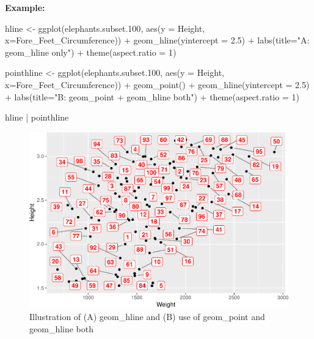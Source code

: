 \documentclass[
]{book}
\newenvironment{Shaded}{\begin{snugshade}}{\end{snugshade}}
\newcommand{\AttributeTok}[1]{\textcolor[rgb]{0.77,0.63,0.00}{#1}}
\newcommand{\DecValTok}[1]{\textcolor[rgb]{0.00,0.00,0.81}{#1}}
\newcommand{\FloatTok}[1]{\textcolor[rgb]{0.00,0.00,0.81}{#1}}
\newcommand{\FunctionTok}[1]{\textcolor[rgb]{0.00,0.00,0.00}{#1}}
\newcommand{\NormalTok}[1]{#1}
\newcommand{\OtherTok}[1]{\textcolor[rgb]{0.56,0.35,0.01}{#1}}
\newcommand{\SpecialCharTok}[1]{\textcolor[rgb]{0.00,0.00,0.00}{#1}}
\newcommand{\StringTok}[1]{\textcolor[rgb]{0.31,0.60,0.02}{#1}}
\begin{document}
\textbf{Example:}

\begin{Shaded}
\begin{Highlighting}[]
\NormalTok{hline }\OtherTok{\textless{}{-}} \FunctionTok{ggplot}\NormalTok{(elephants.subset}\FloatTok{.100}\NormalTok{, }\FunctionTok{aes}\NormalTok{(}\AttributeTok{y =}\NormalTok{ Height, }\AttributeTok{x=}\NormalTok{Fore\_Feet\_Circumference)) }\SpecialCharTok{+} \FunctionTok{geom\_hline}\NormalTok{(}\AttributeTok{yintercept =} \FloatTok{2.5}\NormalTok{) }\SpecialCharTok{+} 
  \FunctionTok{labs}\NormalTok{(}\AttributeTok{title=}\StringTok{"A: \textasciigrave{}geom\_hline\textasciigrave{} only"}\NormalTok{) }\SpecialCharTok{+}
  \FunctionTok{theme}\NormalTok{(}\AttributeTok{aspect.ratio =} \DecValTok{1}\NormalTok{)}

\NormalTok{pointhline }\OtherTok{\textless{}{-}} \FunctionTok{ggplot}\NormalTok{(elephants.subset}\FloatTok{.100}\NormalTok{, }\FunctionTok{aes}\NormalTok{(}\AttributeTok{y =}\NormalTok{ Height, }\AttributeTok{x=}\NormalTok{Fore\_Feet\_Circumference)) }\SpecialCharTok{+} 
  \FunctionTok{geom\_point}\NormalTok{() }\SpecialCharTok{+} 
  \FunctionTok{geom\_hline}\NormalTok{(}\AttributeTok{yintercept =} \FloatTok{2.5}\NormalTok{) }\SpecialCharTok{+} 
  \FunctionTok{labs}\NormalTok{(}\AttributeTok{title=}\StringTok{"B: \textasciigrave{}geom\_point + geom\_hline\textasciigrave{} both"}\NormalTok{) }\SpecialCharTok{+}
  \FunctionTok{theme}\NormalTok{(}\AttributeTok{aspect.ratio =} \DecValTok{1}\NormalTok{)}


\NormalTok{hline }\SpecialCharTok{|}\NormalTok{ pointhline}
\end{Highlighting}
\end{Shaded}

\begin{figure}
\centering
\includegraphics{Data-Visualisation-geom-Encyclopedia_files/figure-latex/unnamed-chunk-41-1.pdf}
\caption{\label{fig:unnamed-chunk-41}Illustration of (A) geom\_hline and (B) use of geom\_point and geom\_hline both}
\end{figure}
\end{document}
